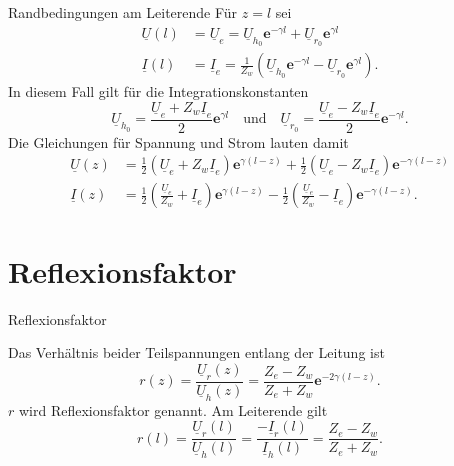 \documentclass{beamer}
\begin{document}
\begin{frame}{Randbedingungen am Leiterende}
Für $z=l$ sei
\begin{align*}
    \underline{U}(l) &= \underline{U}_{e} = \underline{U}_{h_{0}} \mathbf{e}^{- \gamma l}
    +
    \underline{U}_{r_{0}} \mathbf{e}^{ \gamma l} \\[1ex]
    \underline{I}(l) &= \underline{I}_{e} = \frac{1}{Z_{w}}
    \left(
    \underline{U}_{h_{0}} \mathbf{e}^{- \gamma l}
    -
    \underline{U}_{r_{0}} \mathbf{e}^{ \gamma l}
    \right).
\end{align*}
In diesem Fall gilt für die Integrationskonstanten
\[ \underline{U}_{h_{0}} = \frac{\underline{U}_{e} + Z_{w} \underline{I}_{e}}{2} \mathbf{e}^{\gamma l}
\quad \text{und} \quad
\underline{U}_{r_{0}} = \frac{\underline{U}_{e} - Z_{w} \underline{I}_{e}}{2} \mathbf{e}^{- \gamma l}. \]
Die Gleichungen für Spannung und Strom lauten damit
\begin{align}
    \underline{U}(z) &=
    \frac{1}{2} \left( \underline{U}_{e} + Z_{w} \underline{I}_{e} \right) \mathbf{e}^{\gamma (l - z)}
    +
    \frac{1}{2} \left( \underline{U}_{e} - Z_{w} \underline{I}_{e} \right) \mathbf{e}^{- \gamma (l - z)} \label{eq:UxE}
    \\[1ex]
    \underline{I}(z) &=
    \frac{1}{2} \left( \frac{\underline{U}_{e}}{Z_{w}} + \underline{I}_{e} \right) \mathbf{e}^{\gamma (l - z)}
    -
    \frac{1}{2} \left( \frac{\underline{U}_{e}}{Z_{w}} - \underline{I}_{e} \right) \mathbf{e}^{- \gamma (l - z)}
    \label{eq:IxE} .
\end{align}

\end{frame}


\section{Reflexionsfaktor}


\begin{frame}{Reflexionsfaktor}
\begin{figure}[!htb]
    \begin{center}
        
    \end{center}
\end{figure}

Das Verhältnis beider Teilspannungen entlang der Leitung ist
\[
r(z) = \frac{\underline{U}_{r}(z)}{\underline{U}_{h}(z)} =
       \frac{Z_{e}-Z_{w}}{Z_{e}+Z_{w}} \mathbf{e}^{-2 \gamma (l-z)}.
\]
$r$ wird Reflexionsfaktor genannt. Am Leiterende gilt
\begin{equation}
    r(l)
    = \frac{\underline{U}_{r}(l)}{\underline{U}_{h}(l)}
    = \frac{- \underline{I}_{r}(l)}{\underline{I}_{h}(l)}
    = \frac{Z_{e}-Z_{w}}{Z_{e}+Z_{w}} \label{eq:RFactor}.
\end{equation}

\end{frame}
\end{document}
